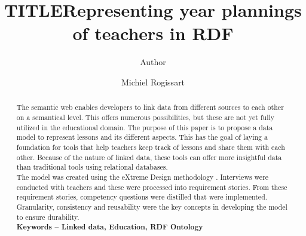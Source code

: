 \documentclass[a4paper]{report}
\title{TITLE}
\author{Author}
\author{Michiel Rogissart}
\title{Representing year plannings of teachers in RDF}
\begin{document}
% 

\setcounter{page}{1}

\newpage

\newpage

\newpage

\newpage



\tableofcontents
\printnoidxglossaries{}
\newpage
{}
\setcounter{page}{1}


\maketitle

    \begin{abstract}
        The semantic web enables developers to link data from different sources to each other on a semantical level.
        This offers numerous possibilities, but these are not yet fully utilized in the educational domain.
        The purpose of this paper is to propose a data model to represent lessons and its different aspects.
        This has the goal of laying a foundation for tools that help teachers keep track of lessons and share them with each other.
        Because of the nature of linked data, these tools can offer more insightful data than traditional tools using relational databases.\\
        The model was created using the eXtreme Design methodology \cite{xd}. Interviews were conducted with teachers and these were processed into requirement stories.
        From these requirement stories, competency questions were distilled that were implemented.\\
        Granularity, consistency and reusability were the key concepts in developing the model to ensure durability.\\
        \textbf{Keywords -- Linked data, Education, RDF Ontology}
        
    \end{abstract}
    
\end{document}
